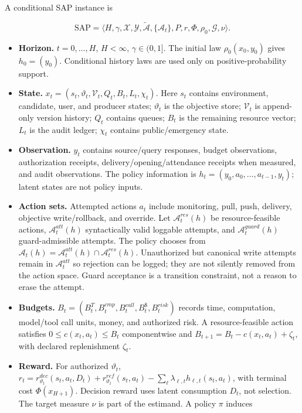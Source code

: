 \documentclass[
  11pt]{article}
\providecommand{\tightlist}{%
  \setlength{\itemsep}{0pt}\setlength{\parskip}{0pt}}
\begin{document}
A conditional SAP instance is

\[\mathrm{SAP}=\langle H,\gamma,\mathcal X,\mathcal Y,\widetilde{\mathcal A},\{\mathcal A_t\},P,r,\Phi,\rho_0,\mathcal G,\nu\rangle.\tag{1}\]

\begin{itemize}
\tightlist
\item
  \textbf{Horizon.} \(t=0,\ldots,H\), \(H<\infty\), \(\gamma\in(0,1]\).
  The initial law \(\rho_0(x_0,y_0)\) gives \(h_0=(y_0)\). Conditional
  history laws are used only on positive-probability support.
\item
  \textbf{State.}
  \(x_t=(s_t,\vartheta_t,\mathcal V_t,Q_t,B_t,L_t,\chi_t)\). Here
  \(s_t\) contains environment, candidate, user, and producer states;
  \(\vartheta_t\) is the objective store; \(\mathcal V_t\) is
  append-only version history; \(Q_t\) contains queues; \(B_t\) is the
  remaining resource vector; \(L_t\) is the audit ledger; \(\chi_t\)
  contains public/emergency state.
\item
  \textbf{Observation.} \(y_t\) contains source/query responses, budget
  observations, authorization receipts, delivery/opening/attendance
  receipts when measured, and audit observations. The policy information
  is \(h_t=(y_0,a_0,\ldots,a_{t-1},y_t)\); latent states are not policy
  inputs.
\item
  \textbf{Action sets.} Attempted actions \(a_t\) include monitoring,
  pull, push, delivery, objective write/rollback, and override. Let
  \(\mathcal A^{res}_t(h)\) be resource-feasible actions,
  \(\mathcal A^{att}_t(h)\) syntactically valid loggable attempts, and
  \(\mathcal A^{guard}_t(h)\) guard-admissible attempts. The policy
  chooses from
  \(\mathcal A_t(h)=\mathcal A^{att}_t(h)\cap\mathcal A^{res}_t(h)\).
  Unauthorized but canonical write attempts remain in
  \(\mathcal A^{att}_t\) so rejection can be logged; they are not
  silently removed from the action space. Guard acceptance is a
  transition constraint, not a reason to erase the attempt.
\item
  \textbf{Budgets.}
  \(B_t=(B_t^T,B_t^{cmp},B_t^{call},B_t^{\$},B_t^{risk})\) records time,
  computation, model/tool call units, money, and authorized risk. A
  resource-feasible action satisfies \(0\le c(x_t,a_t)\le B_t\)
  componentwise and \(B_{t+1}=B_t-c(x_t,a_t)+\zeta_t\), with declared
  replenishment \(\zeta_t\).
\item
  \textbf{Reward.} For authorized \(\vartheta_t\),
  \(r_t=r^{dec}_{\vartheta_t}(s_t,a_t,D_t)+r^{ref}_{\vartheta_t}(s_t,a_t)-\sum_\ell\lambda_{\ell,t}h_{\ell,t}(s_t,a_t)\),
  with terminal cost \(\Phi(x_{H+1})\). Decision reward uses latent
  consumption \(D_t\), not selection. The target measure \(\nu\) is part
  of the estimand. A policy \(\pi\) induces
\end{itemize}
\end{document}
